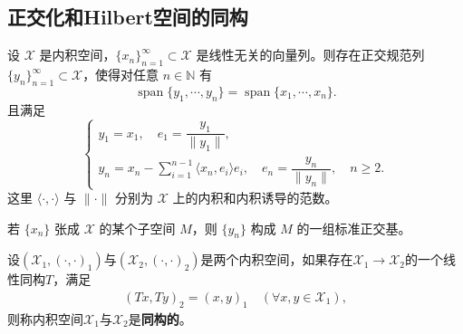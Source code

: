 \documentclass[../../main.tex]{subfiles}%
\begin{document}
\subsection{正交化和Hilbert空间的同构}

\begin{theorem}\label{theorem:Gram-Schmidt正交化}
设 $\mathscr{X}$ 是内积空间，$\{x_n\}_{n=1}^{\infty} \subset \mathscr{X}$ 是线性无关的向量列。则存在正交规范列 $\{y_n\}_{n=1}^{\infty} \subset \mathscr{X}$，使得对任意 $n \in \mathbb{N}$ 有
\[
\operatorname{span}\{y_1,\cdots,y_n\} = \operatorname{span}\{x_1,\cdots,x_n\}.
\]
且满足
\[
\begin{cases}
y_1 = x_1, \quad e_1 = \dfrac{y_1}{\|y_1\|},\\[6pt]
y_n = x_n - \displaystyle\sum_{i=1}^{n-1} \langle x_n, e_i \rangle e_i, \quad e_n = \dfrac{y_n}{\|y_n\|}, \quad n \geqslant 2.
\end{cases}
\]
这里 $\langle\cdot,\cdot\rangle$ 与 $\|\cdot\|$ 分别为 $\mathscr{X}$ 上的内积和内积诱导的范数。

若 $\{x_n\}$ 张成 $\mathscr{X}$ 的某个子空间 $M$，则 $\{y_n\}$ 构成 $M$ 的一组标准正交基。
\end{theorem}

\begin{definition}
设$(\mathscr{X}_1, (\cdot, \cdot)_1)$与$(\mathscr{X}_2, (\cdot, \cdot)_2)$是两个内积空间，如果存在$\mathscr{X}_1 \to \mathscr{X}_2$的一个线性同构$T$，满足
\begin{align*}
(Tx, Ty)_2 = (x, y)_1 \quad (\forall x, y \in \mathscr{X}_1),
\end{align*}
则称内积空间$\mathscr{X}_1$与$\mathscr{X}_2$是\textbf{同构的}。
\end{definition}
\end{document}
